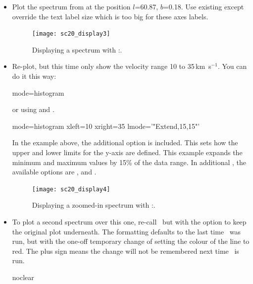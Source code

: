 \documentclass[11pt,oneside,chapters]{starlink}
\newcommand{\udeg}{\hspace{-0.3em}\dgs\hspace{-0.08em}}
\newcommand{\kms}{\mbox{$\,$km~s$^{-1}$}}   %
\newcommand{\udeg}{\HCode{&deg}}
\newcommand{\kms}{\,km~s$^{-1}$}   %
\begin{document}
\begin{itemize}
\item Plot the spectrum from  at the position
$l$=60.\udeg87, $b$=0.\udeg18. Use existing  except
override the text label size which is too big for these axes labels.
\begin{terminalv}
\end{terminalv}

\begin{figure}[h!]
\begin{center}
\texttt{[image: sc20\_display3]}
\caption[Displaying a spectrum with \Kappa:\linplot.]{\label{fig:display3}
  Displaying a spectrum with \Kappa:\linplot.}
\end{center}
\end{figure}

\item Re-plot, but this time only show the velocity range 10 to 35\kms.
You can do it this way:
\begin{terminalv}
  mode=histogram
\end{terminalv}
or using  and .
\begin{terminalv}
  mode=histogram xleft=10 xright=35 lmode='"Extend,15,15"'
\end{terminalv}
In the example above, the additional option  is included.
This sets how the upper and lower limits for the y-axis are defined.
This example expands the minimum and maximum values by 15\% of the
data range. In additional , the available options are
,  and .

\begin{figure}[h!]
\begin{center}
\texttt{[image: sc20\_display4]}
\caption[Displaying a zoomed-in spectrum with \Kappa:\linplot.]{\label{fig:display4}
  Displaying a zoomed-in spectrum with \Kappa:\linplot.}
\end{center}
\end{figure}

\item To plot a second spectrum over this one, re-call \linplot\ but
with the  option to keep the original plot underneath.
The formatting defaults to the last time \linplot\ was run, but with
the one-off temporary change of setting the colour of the line to red.
The plus sign means the change will not be remembered next time
\linplot\ is run.
\begin{terminalv}
  noclear
\end{terminalv}
\end{itemize}
\end{document}
